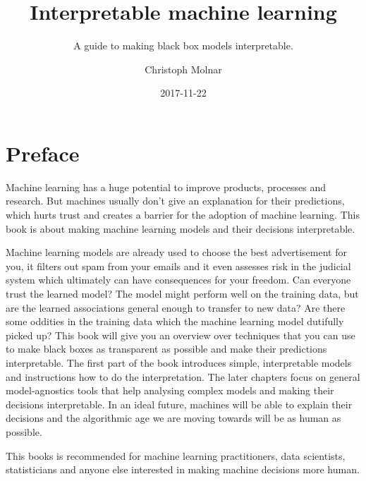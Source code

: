 \documentclass[12pt,]{krantz}
\title{Interpretable machine learning}
\subtitle{A guide to making black box models interpretable.}
\author{Christoph Molnar}
\date{2017-11-22}
\theoremstyle{definition}
\theoremstyle{definition}
\theoremstyle{definition}
\theoremstyle{remark}
\begin{document}
\maketitle



\setlength{\abovedisplayskip}{-5pt}
\setlength{\abovedisplayshortskip}{-5pt}

{
\hypersetup{linkcolor=black}
\setcounter{tocdepth}{1}
\tableofcontents
}
\chapter*{Preface}\label{preface}

Machine learning has a huge potential to improve products, processes and
research. But machines usually don't give an explanation for their
predictions, which hurts trust and creates a barrier for the adoption of
machine learning. This book is about making machine learning models and
their decisions interpretable.

Machine learning models are already used to choose the best
advertisement for you, it filters out spam from your emails and it even
assesses risk in the judicial system which ultimately can have
consequences for your freedom. Can everyone trust the learned model? The
model might perform well on the training data, but are the learned
associations general enough to transfer to new data? Are there some
oddities in the training data which the machine learning model dutifully
picked up? This book will give you an overview over techniques that you
can use to make black boxes as transparent as possible and make their
predictions interpretable. The first part of the book introduces simple,
interpretable models and instructions how to do the interpretation. The
later chapters focus on general model-agnostics tools that help
analysing complex models and making their decisions interpretable. In an
ideal future, machines will be able to explain their decisions and the
algorithmic age we are moving towards will be as human as possible.

This books is recommended for machine learning practitioners, data
scientists, statisticians and anyone else interested in making machine
decisions more human.
\end{document}
